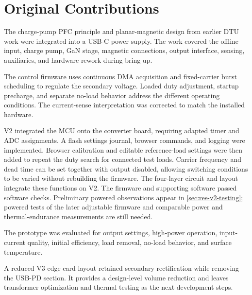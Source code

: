 \section{Original Contributions}
\label{sec:concl-contributions}

The charge-pump PFC principle and planar-magnetic design from earlier DTU
work were integrated into a USB-C power supply. The work covered
the offline input, charge pump, GaN stage, magnetic connections, output
interface, sensing, auxiliaries, and hardware rework during bring-up.

The control firmware uses continuous DMA acquisition and fixed-carrier
burst scheduling to regulate the secondary voltage. Loaded duty adjustment,
startup precharge, and separate no-load behavior address the different
operating conditions. The current-sense interpretation was corrected to
match the installed hardware.

V2 integrated the MCU onto the converter board, requiring adapted timer and
ADC assignments. A flash settings journal, browser commands, and logging
were implemented. Browser calibration and editable reference-load settings
were then added to repeat the duty search for connected test loads. Carrier
frequency and dead time can be set together with output disabled, allowing
switching conditions to be varied without rebuilding the firmware. The four-layer circuit and layout integrate these functions on V2.
The firmware and supporting software passed software checks.
Preliminary powered observations appear in \cref{sec:res-v2-testing};
powered tests of the later adjustable firmware and comparable power and
thermal-endurance measurements are still needed.

The prototype was evaluated for output settings, high-power operation,
input-current quality, initial efficiency, load removal, no-load behavior,
and surface temperature.

A reduced V3 edge-card layout retained secondary rectification while
removing the USB-PD section. It provides a design-level volume reduction
and leaves transformer optimization and thermal testing as the next
development steps.
